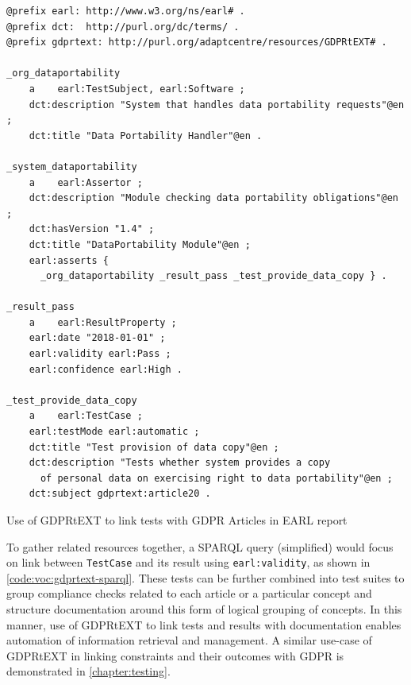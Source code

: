 \begin{listing}
\begin{verbatim}
@prefix earl: http://www.w3.org/ns/earl# .
@prefix dct:  http://purl.org/dc/terms/ .
@prefix gdprtext: http://purl.org/adaptcentre/resources/GDPRtEXT# .

_org_dataportability
    a    earl:TestSubject, earl:Software ;
    dct:description "System that handles data portability requests"@en ;
    dct:title "Data Portability Handler"@en .

_system_dataportability
    a    earl:Assertor ;
    dct:description "Module checking data portability obligations"@en ;
    dct:hasVersion "1.4" ;
    dct:title "DataPortability Module"@en ;
    earl:asserts { 
      _org_dataportability _result_pass _test_provide_data_copy } .

_result_pass
    a    earl:ResultProperty ;
    earl:date "2018-01-01" ;
    earl:validity earl:Pass ;
    earl:confidence earl:High .

_test_provide_data_copy
    a    earl:TestCase ;
    earl:testMode earl:automatic ;
    dct:title "Test provision of data copy"@en ;
    dct:description "Tests whether system provides a copy 
      of personal data on exercising right to data portability"@en ;
    dct:subject gdprtext:article20 .
\end{verbatim}
\caption{Use of GDPRtEXT to link tests with GDPR Articles in EARL report}
\label{earl}
\end{listing}

To gather related resources together, a SPARQL query (simplified) would focus on link between \texttt{TestCase} and its result using \texttt{earl:validity}, as shown in \autoref{code:voc:gdprtext-sparql}.
These tests can be further combined into test suites to group compliance checks related to each article or a particular concept and structure  documentation around this form of logical grouping of concepts.
In this manner, use of GDPRtEXT to link tests and results with documentation enables automation of information retrieval and management.
A similar use-case of GDPRtEXT in linking constraints and their outcomes with GDPR is demonstrated in \autoref{chapter:testing}.

